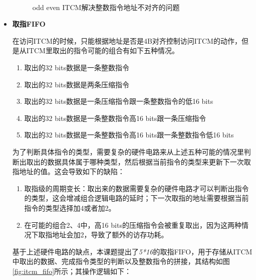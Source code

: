 \documentclass[a4paper, 12pt]{article}
\begin{document}
\begin{itemize}
    \begin{figure}[htbp]
      \centering
      \\
      \caption{odd even ITCM解决整数指令地址不对齐的问题}
      \label{fig:2bank_ITCM}
    \end{figure}
  \item \textbf{取指FIFO}

    在访问ITCM的时候，只能根据地址是否是4B对齐控制访问ITCM的动作，但是从ITCM里取出的指令可能的组合有如下五种情况\cite{1022693926.nh}。
    \begin{enumerate}
      \item 取出的32 bits数据是一条整数指令
      \item 取出的32 bits数据是两条压缩指令
      \item 取出的32 bits数据是一条压缩指令跟一条整数指令的低16 bits
      \item 取出的32 bits数据是一条整数指令高16 bits跟一条压缩指令
      \item 取出的32 bits数据是一条整数指令高16 bits跟一条整数指令低16 bits
    \end{enumerate}
为了判断具体指令的类型，需要复杂的硬件电路来从上述五种可能的情况里判断出取出的数据具体属于哪种类型，然后根据当前指令的类型来更新下一次取指地址的值。这会导致如下的缺陷：
\begin{enumerate}
  \item 取指级的周期变长：取出来的数据需要复杂的硬件电路才可以判断出指令的类型，这会增减组合逻辑电路的延时；下一次取指的地址需要根据当前指令的类型选择加4或者加2。
  \item 在可能的组合2、4中，高16 bits的压缩指令会被重复取出，因为这两种情况下取指地址会加2，导致了额外的访存功耗。
\end{enumerate}
    基于上述硬件电路的缺点，本课题提出了\textit{5*16}的取指FIFO，用于存储从ITCM中取出的数据、完成指令类型的判断以及整数指令的拼接，其结构如图\ref{fig:itcm_fifo}所示；其操作逻辑如下：


\end{itemize}
\end{document}
